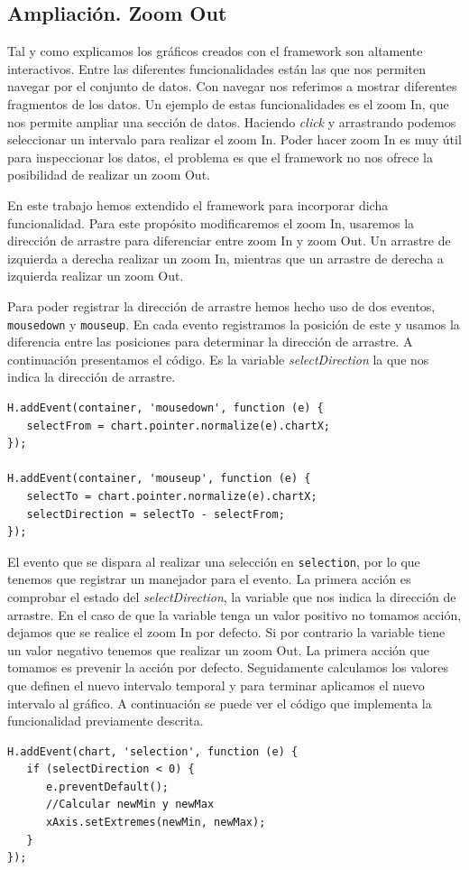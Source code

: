 	\subsection{Ampliación. Zoom Out}
		Tal y como explicamos los gráficos creados con el framework son altamente interactivos. Entre las diferentes funcionalidades están las
		que nos permiten navegar por el conjunto de datos. Con navegar nos referimos a mostrar diferentes fragmentos de los datos. Un ejemplo
		de estas funcionalidades es el zoom In, que nos permite ampliar una sección de datos. Haciendo \emph{click} y arrastrando podemos
		seleccionar un intervalo para realizar el zoom In. Poder hacer zoom In es muy útil para inspeccionar los datos, el problema es que el
		framework no nos ofrece la posibilidad de realizar un zoom Out.
		\par
		En este trabajo hemos extendido el framework para incorporar dicha funcionalidad. Para este propósito modificaremos el zoom In,
		usaremos la dirección de arrastre para diferenciar entre zoom In y zoom Out. Un arrastre de izquierda a derecha realizar un zoom In,
		mientras que un arrastre de derecha a izquierda realizar un zoom Out. 
		\par
		Para poder registrar la dirección de arrastre hemos hecho uso de dos eventos, \texttt{mousedown} y \texttt{mouseup}. En cada evento
		registramos la posición de este y usamos la diferencia entre las posiciones para determinar la dirección de arrastre. A continuación
		presentamos el código. Es la variable \emph{selectDirection} la que nos indica la dirección de arrastre.
		\begin{lstlisting}
H.addEvent(container, 'mousedown', function (e) {
   selectFrom = chart.pointer.normalize(e).chartX;
});

H.addEvent(container, 'mouseup', function (e) {
   selectTo = chart.pointer.normalize(e).chartX;
   selectDirection = selectTo - selectFrom;													            
});
		\end{lstlisting}
		\par
		El evento que se dispara al realizar una selección en \texttt{selection}, por lo que tenemos que registrar un manejador para el
		evento. La primera acción es comprobar el estado del \emph{selectDirection}, la variable que nos indica la dirección de arrastre. En
		el caso de que la variable tenga un valor positivo no tomamos acción, dejamos que se realice el zoom In por defecto. Si por contrario
		la variable tiene un valor negativo tenemos que realizar un zoom Out. La primera acción que tomamos es prevenir la acción por defecto.
		Seguidamente calculamos los valores que definen el nuevo intervalo temporal y para terminar aplicamos el nuevo intervalo al gráfico. A
		continuación se puede ver el código que implementa la funcionalidad previamente descrita.
		\begin{lstlisting}
H.addEvent(chart, 'selection', function (e) {
   if (selectDirection < 0) {
      e.preventDefault();
      //Calcular newMin y newMax
      xAxis.setExtremes(newMin, newMax);
   }
});
		\end{lstlisting}

